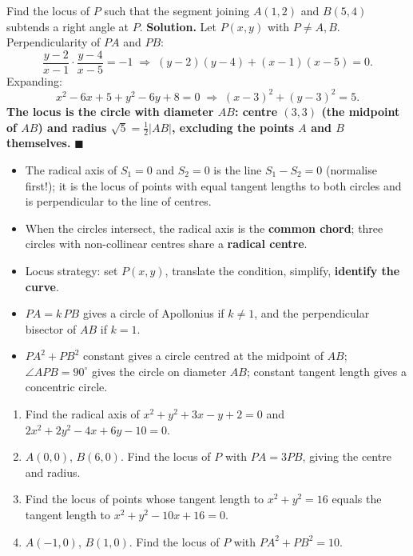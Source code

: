 \documentclass[11pt]{article}
\newcommand{\cle}[1]{{\popxbold\color{popdark}#1}}
\begin{document}
\begin{exoresolu}
Find the locus of $P$ such that the segment joining $A(1, 2)$ and $B(5, 4)$ subtends a right angle at $P$.
\tcblower
\textbf{Solution.} Let $P(x, y)$ with $P \neq A, B$. Perpendicularity of $PA$ and $PB$:
\[
\frac{y - 2}{x - 1}\cdot\frac{y - 4}{x - 5} = -1
\;\Longrightarrow\;
(y-2)(y-4) + (x-1)(x-5) = 0.
\]
Expanding:
\[
x^2 - 6x + 5 + y^2 - 6y + 8 = 0
\;\Longrightarrow\;
(x-3)^2 + (y-3)^2 = 5.
\]
\textbf{The locus is the circle with diameter $AB$: centre $(3, 3)$ (the midpoint of $AB$) and radius $\sqrt{5} = \tfrac{1}{2}|AB|$, excluding the points $A$ and $B$ themselves.} $\blacksquare$
\end{exoresolu}

\begin{aretenir}
\begin{itemize}
\item The \cle{radical axis} of $S_1 = 0$ and $S_2 = 0$ is the line $S_1 - S_2 = 0$ (normalise first!); it is the locus of points with equal tangent lengths to both circles and is perpendicular to the line of centres.
\item When the circles intersect, the radical axis is the \textbf{common chord}; three circles with non-collinear centres share a \textbf{radical centre}.
\item Locus strategy: set $P(x, y)$, translate the condition, simplify, \textbf{identify the curve}.
\item $PA = k\,PB$ gives a circle of Apollonius if $k \neq 1$, and the perpendicular bisector of $AB$ if $k = 1$.
\item $PA^2 + PB^2$ constant gives a circle centred at the midpoint of $AB$; $\angle APB = 90^{\circ}$ gives the circle on diameter $AB$; constant tangent length gives a concentric circle.
\end{itemize}
\end{aretenir}

\begin{exercice}[Practice]
\begin{enumerate}
\item Find the radical axis of $x^2 + y^2 + 3x - y + 2 = 0$ and $2x^2 + 2y^2 - 4x + 6y - 10 = 0$.
\item $A(0,0)$, $B(6,0)$. Find the locus of $P$ with $PA = 3PB$, giving the centre and radius.
\item Find the locus of points whose tangent length to $x^2 + y^2 = 16$ equals the tangent length to $x^2 + y^2 - 10x + 16 = 0$.
\item $A(-1, 0)$, $B(1, 0)$. Find the locus of $P$ with $PA^2 + PB^2 = 10$.
\end{enumerate}
\end{exercice}
\end{document}
